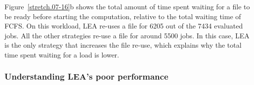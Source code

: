 \documentclass[conference,10pt]{IEEEtran}
\begin{document}

Figure~\ref{stretch.07-16}b
shows the total amount of time spent 
waiting for a file to be ready before starting the computation,
relative to the total waiting time of FCFS.
On this workload, LEA re-uses a file for 6205 out of the 7434 evaluated jobs.
All the other strategies re-use a file for around 5500 jobs.
In this case, LEA is the only strategy that increases the
file re-use, which explains why the total time spent waiting for a load is lower.

\subsubsection{Understanding LEA's poor performance}
\end{document}
